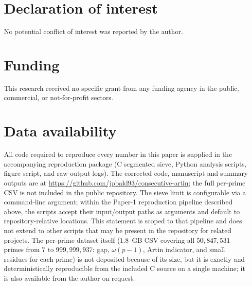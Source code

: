 \documentclass[11pt]{amsart}
\theoremstyle{definition}
\begin{document}
\section*{Declaration of interest}
No potential conflict of interest was reported by the author.

\section*{Funding}
This research received no specific grant from any funding agency in the
public, commercial, or not-for-profit sectors.

\section*{Data availability}
All code required to reproduce every number in this paper is supplied in the
accompanying reproduction package (C segmented sieve, Python analysis scripts,
figure script, and raw output logs). The corrected code, manuscript and summary
outputs are at \url{https://github.com/jpbald93/consecutive-artin}; the
full per-prime CSV is not included in the public repository. The sieve limit is
configurable via a command-line argument; within the Paper-1 reproduction
pipeline described above, the scripts accept their input/output paths as
arguments and default to repository-relative locations. This statement is
scoped to that pipeline and does not extend to other scripts that may be
present in the repository for related projects.
The per-prime dataset itself ($1.8$~GB CSV covering all $50{,}847{,}531$
primes from $7$ to $999{,}999{,}937$: gap, $\omega(p-1)$, Artin indicator,
and small residues for each prime) is not deposited because of its size, but
it is exactly and deterministically reproducible from the included C source on
a single machine; it is also available from the author on request.
\end{document}
